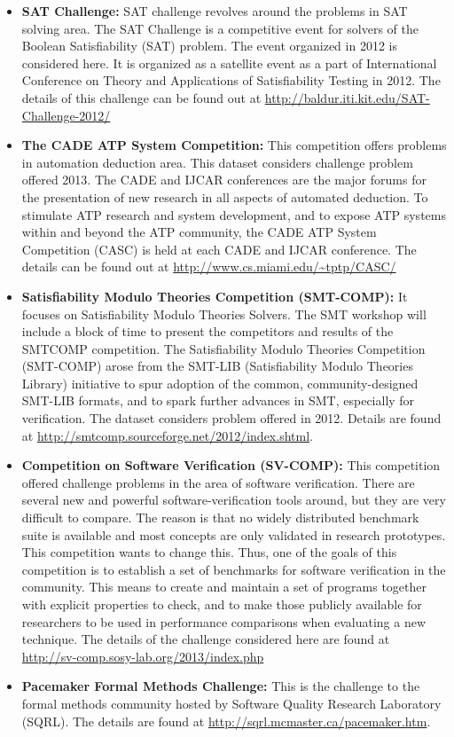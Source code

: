 \documentclass[11pt,letterpaper]{report}
\begin{document}
\begin{itemize}
\item \textbf{SAT Challenge: } SAT challenge revolves around the problems in SAT solving area. The SAT Challenge is a competitive event for solvers of the Boolean Satisfiability (SAT) problem. The event organized in 2012 is considered here. It is organized as a satellite event as a part of International Conference on Theory and Applications of Satisfiability Testing in 2012. The details of this challenge can be found out at \url{http://baldur.iti.kit.edu/SAT-Challenge-2012/} \cite{SAT}
\item \textbf{The CADE ATP System Competition: } This competition offers problems in automation deduction area. This dataset considers challenge problem offered 2013. The CADE and IJCAR conferences are the major forums for the presentation of new research in all aspects of automated deduction. To stimulate ATP research and system development, and to expose ATP systems within and beyond the ATP community, the CADE ATP System Competition (CASC) is held at each CADE and IJCAR conference. The details can be found out at \url{http://www.cs.miami.edu/~tptp/CASC/} \cite{CADE}
\item \textbf{Satisfiability Modulo Theories Competition (SMT-COMP): } It focuses on Satisfiability Modulo Theories Solvers. The SMT workshop will include a block of time to present the competitors and results of the SMTCOMP competition. The Satisfiability Modulo Theories Competition (SMT-COMP) arose from the SMT-LIB (Satisfiability Modulo Theories Library) initiative to spur adoption of the common, community-designed SMT-LIB formats, and to spark further advances in SMT, especially for verification. The dataset considers problem offered in 2012. Details are found at \url{http://smtcomp.sourceforge.net/2012/index.shtml}. \cite{SMT}
\item \textbf{Competition on Software Verification (SV-COMP): } This competition offered challenge problems in the area of software verification. There are several new and powerful software-verification tools around, but they are very difficult to compare. The reason is that no widely distributed benchmark suite is available and most concepts are only validated in research prototypes. This competition wants to change this. Thus, one of the goals of this competition is to establish a set of benchmarks for software verification in the community. This means to create and maintain a set of programs together with explicit properties to check, and to make those publicly available for researchers to be used in performance comparisons when evaluating a new technique. The details of the challenge considered here are found at \url{http://sv-comp.sosy-lab.org/2013/index.php} \cite{SV}
\item \textbf{Pacemaker Formal Methods Challenge: } This is the challenge to the formal methods community hosted by Software Quality Research Laboratory (SQRL). The details are found at \url{http://sqrl.mcmaster.ca/pacemaker.htm}. \cite{Pacemaker}
\end{itemize}
\end{document}
